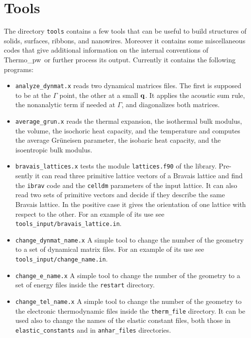 \documentclass[12pt,a4paper,twoside]{report}
\def\thermo{{\sc Thermo}\_{\sc pw}}
\begin{document}
\newpage
{\color{dark-blue}\chapter{Tools}}
\color{black}

The directory \texttt{tools} contains a few tools that can be useful to build
structures of solids, surfaces, ribbons, and nanowires. Moreover it 
contains some miscellaneous codes that give additional information
on the internal conventions of \thermo\ or further process its output. 
Currently it contains the following programs:

\begin{itemize}

\item \texttt{analyze\_dynmat.x} reads two dynamical matrices files. The 
first is supposed to be at the $\Gamma$ point, the other at a small 
${\bf q}$. It applies the acoustic sum rule, the nonanalytic term
if needed at $\Gamma$, and diagonalizes both matrices. 

\item \texttt{average\_grun.x} reads the thermal expansion, 
the isothermal bulk modulus, the volume, the isochoric heat capacity,
and the temperature and computes the average Gr\"uneisen parameter,
the isobaric heat capacity, and the isoentropic bulk modulus.

\item \texttt{bravais\_lattices.x} tests the
module \texttt{lattices.f90} of the library. Pre- sently it can read three
primitive lattice vectors of a Bravais lattice and find the \texttt{ibrav}
code and the \texttt{celldm} parameters of the input lattice. It
can also read two sets of primitive vectors and decide if they describe
the same Bravais lattice. In the positive case it gives the orientation
of one lattice with respect to the other.
For an example of its use see \texttt{tools\_input/bravais\_lattice.in}.

\item \texttt{change\_dynmat\_name.x} A simple tool 
to change the number of the geometry to a set of dynamical matrix files. 
For an example of its use see \texttt{tools\_input/change\_name.in}.

\item \texttt{change\_e\_name.x} A simple tool to change the number of the 
geometry to a set of energy files inside the \texttt{restart} directory. 

\item \texttt{change\_tel\_name.x} A simple tool to change the number of the 
geometry to the electronic thermodynamic files inside the \texttt{therm\_file} 
directory. It can be used also to change the names of the elastic constant
files, both those in \texttt{elastic\_constants} and in \texttt{anhar\_files}
directories.


\end{itemize}
\end{document}
